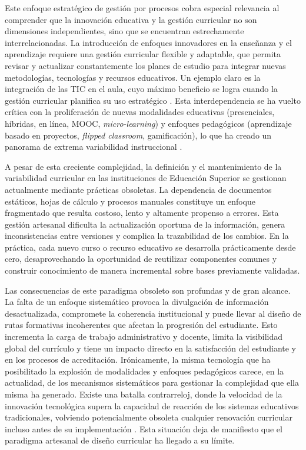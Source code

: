 Este enfoque estratégico de gestión por procesos cobra especial relevancia al comprender que 
la innovación educativa y la gestión curricular no son dimensiones independientes, sino que se encuentran 
estrechamente interrelacionadas. La introducción de enfoques innovadores en la enseñanza y el aprendizaje 
requiere una gestión curricular flexible y adaptable, que permita revisar y actualizar 
constantemente los planes de estudio para integrar nuevas metodologías, tecnologías y 
recursos educativos. Un ejemplo claro es la integración de las \ac{TIC} en el aula, cuyo 
máximo beneficio se logra cuando la gestión curricular planifica su uso estratégico 
\citep{gomez2023}. Esta interdependencia se ha vuelto crítica con la proliferación de 
nuevas modalidades educativas (presenciales, híbridas, en línea, \ac{MOOC}, 
\textit{micro-learning}) y enfoques pedagógicos (aprendizaje basado en proyectos, 
\textit{flipped classroom}, gamificación), lo que ha creado un panorama de extrema 
variabilidad instruccional \citep{bates2019teaching}.

A pesar de esta creciente complejidad, la definición y el mantenimiento de la 
variabilidad curricular en las instituciones de Educación Superior se gestionan actualmente 
mediante prácticas obsoletas. La dependencia de documentos estáticos, hojas de cálculo y 
procesos manuales constituye un enfoque fragmentado que resulta costoso, lento y altamente 
propenso a errores. Esta gestión artesanal dificulta la actualización oportuna de la información, 
genera inconsistencias entre versiones y complica la trazabilidad de los cambios. En la práctica, 
cada nuevo curso o recurso educativo se desarrolla prácticamente desde cero, desaprovechando la 
oportunidad de reutilizar componentes comunes y construir conocimiento de manera incremental sobre 
bases previamente validadas.

Las consecuencias de este paradigma obsoleto son profundas y de gran alcance. La falta de un 
enfoque sistemático provoca la divulgación de información desactualizada, compromete la coherencia 
institucional y puede llevar al diseño de rutas formativas incoherentes que afectan la progresión 
del estudiante. Esto incrementa la carga de trabajo administrativo y docente, limita la visibilidad 
global del currículo y tiene un impacto directo en la satisfacción del estudiante y en los procesos 
de acreditación. Irónicamente, la misma tecnología que ha posibilitado la explosión de modalidades 
y enfoques pedagógicos carece, en la actualidad, de los mecanismos sistemáticos para gestionar 
la complejidad que ella misma ha generado. Existe una batalla contrarreloj, donde 
la velocidad de la innovación tecnológica supera la capacidad de reacción de los sistemas educativos 
tradicionales, volviendo potencialmente obsoleta cualquier renovación curricular incluso antes de 
su implementación \citep{sanchez2020metodologia}. Esta situación deja de manifiesto que el paradigma 
artesanal de diseño curricular ha llegado a su límite.

